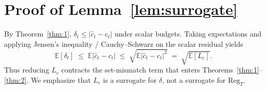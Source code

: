 \section{Proof of Lemma~\ref{lem:surrogate}}
\label{app:surrogate}

By Theorem~\ref{thm:1}, $\delta_t\le\lvert\hat c_t-c_t\rvert$ under scalar budgets.
Taking expectations and applying Jensen's inequality / Cauchy--Schwarz on the scalar residual yields
\begin{equation}
\mathbb{E}[\delta_t]
\;\le\;
\mathbb{E}\lvert\hat c_t-c_t\rvert
\;\le\;
\sqrt{\mathbb{E}\lvert\hat c_t-c_t\rvert^2}
\;=\;
\sqrt{\mathbb{E}[L_c]}.
\end{equation}
Thus reducing $L_c$ contracts the set-mismatch term that enters Theorems~\ref{thm:1}--\ref{thm:2}.
We emphasize that $L_c$ is a surrogate for $\delta$, not a surrogate for $\mathrm{Reg}_T$.
